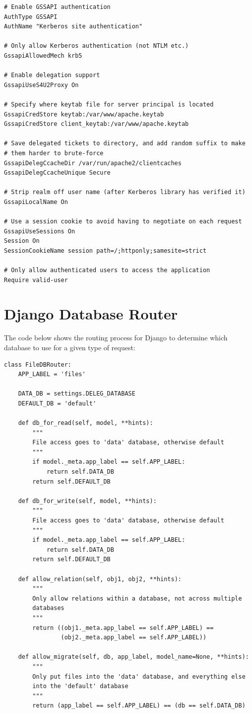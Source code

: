 \documentclass[12pt]{report}
\begin{document}
\begin{verbatim}
# Enable GSSAPI authentication
AuthType GSSAPI
AuthName "Kerberos site authentication"

# Only allow Kerberos authentication (not NTLM etc.)
GssapiAllowedMech krb5

# Enable delegation support
GssapiUseS4U2Proxy On

# Specify where keytab file for server principal is located
GssapiCredStore keytab:/var/www/apache.keytab
GssapiCredStore client_keytab:/var/www/apache.keytab

# Save delegated tickets to directory, and add random suffix to make
# them harder to brute-force
GssapiDelegCcacheDir /var/run/apache2/clientcaches
GssapiDelegCcacheUnique Secure

# Strip realm off user name (after Kerberos library has verified it)
GssapiLocalName On

# Use a session cookie to avoid having to negotiate on each request
GssapiUseSessions On
Session On
SessionCookieName session path=/;httponly;samesite=strict

# Only allow authenticated users to access the application
Require valid-user
\end{verbatim}

\chapter{Django Database Router}
\label{sec:appendix2}
The code below shows the routing process for Django to determine which database to use for a given type of request:

\begin{verbatim}
class FileDBRouter:
    APP_LABEL = 'files'

    DATA_DB = settings.DELEG_DATABASE
    DEFAULT_DB = 'default'

    def db_for_read(self, model, **hints):
        """
        File access goes to 'data' database, otherwise default
        """
        if model._meta.app_label == self.APP_LABEL:
            return self.DATA_DB
        return self.DEFAULT_DB

    def db_for_write(self, model, **hints):
        """
        File access goes to 'data' database, otherwise default
        """
        if model._meta.app_label == self.APP_LABEL:
            return self.DATA_DB
        return self.DEFAULT_DB

    def allow_relation(self, obj1, obj2, **hints):
        """
        Only allow relations within a database, not across multiple
        databases
        """
        return ((obj1._meta.app_label == self.APP_LABEL) ==
                (obj2._meta.app_label == self.APP_LABEL))

    def allow_migrate(self, db, app_label, model_name=None, **hints):
        """
        Only put files into the 'data' database, and everything else
        into the 'default' database
        """
        return (app_label == self.APP_LABEL) == (db == self.DATA_DB)
\end{verbatim}
\end{document}
